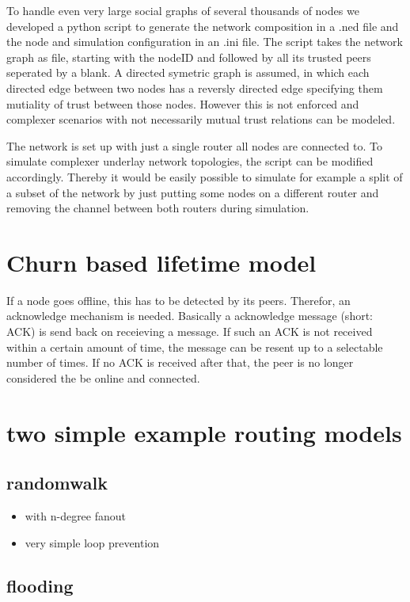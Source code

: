 To handle even very large social graphs of several thousands of nodes we developed a python script to generate the network composition in a .ned file and the node and simulation configuration in an .ini file. The script takes the network graph as file, starting with the nodeID and followed by all its trusted peers seperated by a blank. A directed symetric graph is assumed, in which each directed edge between two nodes has a reversly directed edge specifying them mutiality of trust between those nodes. However this is not enforced and complexer scenarios with not necessarily mutual trust relations can be modeled.

The network is set up with just a single router all nodes are connected to. To simulate complexer underlay network topologies, the script can be modified accordingly. Thereby it would be easily possible to simulate for example a split of a subset of the network by just putting some nodes on a different router and removing the channel between both routers during simulation.

\section{Churn based lifetime model}

If a node goes offline, this has to be detected by its peers. Therefor, an acknowledge mechanism is needed. Basically a acknowledge message (short: ACK) is send back on receieving a message. If such an ACK is not received within a certain amount of time, the message can be resent up to a selectable number of times. If no ACK is received after that, the peer is no longer considered the be online and connected.



\section{two simple example routing models}

\subsection{randomwalk}

\begin{itemize}
\item            with n-degree fanout
\item            very simple loop prevention
\end{itemize}

\subsection{flooding}
